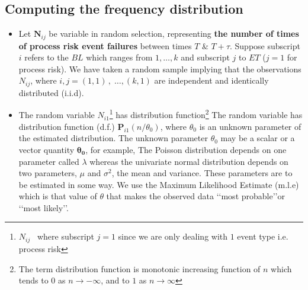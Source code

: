 \documentclass{DissertateUSU}
\begin{document}
\subsection{Computing the frequency distribution}

\begin{itemize}
\item Let $\mathbf{N}_{ij}$ be variable in random selection, representing \textbf{the number of times of process risk event failures} between times $T$ \& $T +\tau$. Suppose subscript $i$ refers to the $BL$ which ranges from \begin{math} 1, \ldots, k \end{math} and subscript $j$ to $ET$ ($j=1$ for process risk). We have taken a random sample implying that the observations \begin{math} N_{ij}\end{math}, {where} \begin{math}{i,j}= (1,1)\,,\;\ldots, (k,1)\end{math} are independent and identically distributed (i.i.d). 

\item The random variable $N_{i1}$\footnote{$N_{ij}$ \, where subscript $j=1$ since we are only dealing with $1$ event type i.e. process risk} has distribution function\footnote{The term distribution function is monotonic increasing function of $n$ which tends to $0$ as \begin{math} n \longrightarrow -\infty\end{math}, and to $1$ as \begin{math} n \longrightarrow \infty \end{math}} The random variable has distribution function (d.f.) \begin{math}\mathbf{P}_{i1}(n/\theta_0)  \end{math}, where $\theta_0$ is an unknown parameter of the estimated distribution.  The unknown parameter $\theta_0$ may be a scalar or a vector quantity \begin{math}\mathbf{\theta_0}\end{math}, for example, The Poisson distribution depends on one parameter called $\lambda$ whereas the univariate normal distribution depends on two parameters, $\mu$ and $\sigma ^2$, the mean and variance.  These parameters are to be estimated in some way. We use the Maximum Likelihood Estimate (m.l.e) which is that value of $\theta$ that makes the observed data \lq\lq most probable\rq\rq or \lq\lq most likely\rq\rq.\medskip


\end{itemize}
\end{document}
